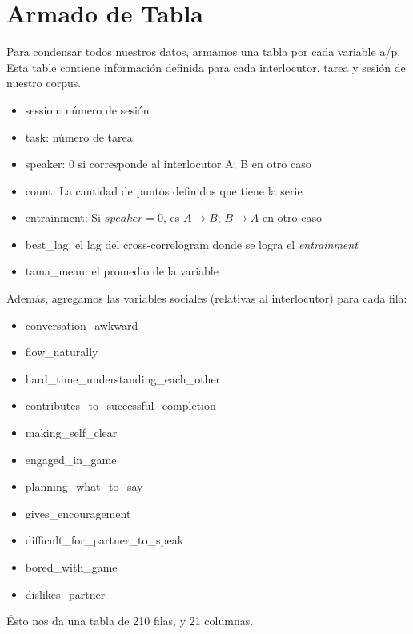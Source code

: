 \section{Armado de Tabla}

Para condensar todos nuestros datos, armamos una tabla por cada variable a/p. Esta table contiene información definida para cada interlocutor, tarea y sesión de nuestro corpus.

\begin{itemize}
  \item session: número de sesión
  \item task: número de tarea
  \item speaker: 0 si corresponde al interlocutor A; B en otro caso
  \item count: La cantidad de puntos definidos que tiene la serie
  \item entrainment: Si $speaker=0$, es $A\rightarrow B$; $B \rightarrow A$ en otro caso
  \item best\_lag: el lag del cross-correlogram donde se logra el \emph{entrainment}
  \item tama\_mean: el promedio de la variable
\end{itemize}

Además, agregamos las variables sociales (relativas al interlocutor) para cada fila:

\begin{itemize}
  \item conversation\_awkward
  \item flow\_naturally
  \item hard\_time\_understanding\_each\_other
  \item contributes\_to\_successful\_completion
  \item making\_self\_clear
  \item engaged\_in\_game
  \item planning\_what\_to\_say
  \item gives\_encouragement
  \item difficult\_for\_partner\_to\_speak
  \item bored\_with\_game
  \item dislikes\_partner
\end{itemize}

Ésto nos da una tabla de 210 filas, y 21 columnas.
